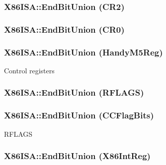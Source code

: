 \label{namespaceX86ISA_aaf77e09150e1b34a14d4f96e956c3f8c}
\hypertarget{namespaceX86ISA_a6fb30c9c1ad6d18a04268626472a30d8}{
\subsubsection[{EndBitUnion}]{\setlength{\rightskip}{0pt plus 5cm}X86ISA::EndBitUnion (CR2)}}
\label{namespaceX86ISA_a6fb30c9c1ad6d18a04268626472a30d8}
\hypertarget{namespaceX86ISA_aad28ecf95b3da4ad6726c2b56e0fa95a}{
\subsubsection[{EndBitUnion}]{\setlength{\rightskip}{0pt plus 5cm}X86ISA::EndBitUnion (CR0)}}
\label{namespaceX86ISA_aad28ecf95b3da4ad6726c2b56e0fa95a}
\hypertarget{namespaceX86ISA_ad8865619d442f312bd5bab7adadf3d86}{
\subsubsection[{EndBitUnion}]{\setlength{\rightskip}{0pt plus 5cm}X86ISA::EndBitUnion (HandyM5Reg)}}
\label{namespaceX86ISA_ad8865619d442f312bd5bab7adadf3d86}
Control registers \hypertarget{namespaceX86ISA_ac07994f7a93f2a18d925d25590d4a9f6}{
\subsubsection[{EndBitUnion}]{\setlength{\rightskip}{0pt plus 5cm}X86ISA::EndBitUnion (RFLAGS)}}
\label{namespaceX86ISA_ac07994f7a93f2a18d925d25590d4a9f6}
\hypertarget{namespaceX86ISA_a5a5281caa3a9093cbf9cf11cd0707381}{
\subsubsection[{EndBitUnion}]{\setlength{\rightskip}{0pt plus 5cm}X86ISA::EndBitUnion (CCFlagBits)}}
\label{namespaceX86ISA_a5a5281caa3a9093cbf9cf11cd0707381}
RFLAGS \hypertarget{namespaceX86ISA_ad59b56d2c756ba2c3ed73fda3a246a3a}{
\subsubsection[{EndBitUnion}]{\setlength{\rightskip}{0pt plus 5cm}X86ISA::EndBitUnion (X86IntReg)}}
\label{namespaceX86ISA_ad59b56d2c756ba2c3ed73fda3a246a3a}



